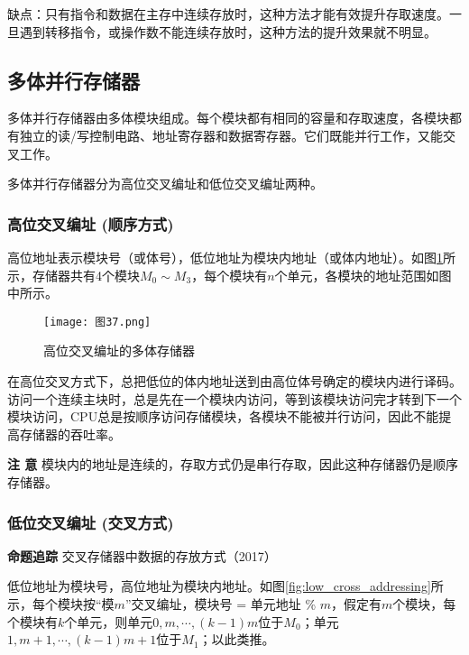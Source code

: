 \documentclass[UTF8]{ctexart}
\begin{document}
	缺点：只有指令和数据在主存中连续存放时，这种方法才能有效提升存取速度。一旦遇到转移指令，或操作数不能连续存放时，这种方法的提升效果就不明显。
	
	\subsection{多体并行存储器}
	多体并行存储器由多体模块组成。每个模块都有相同的容量和存取速度，各模块都有独立的读/写控制电路、地址寄存器和数据寄存器。它们既能并行工作，又能交叉工作。
	
	多体并行存储器分为高位交叉编址和低位交叉编址两种。
	
	\subsubsection{高位交叉编址 (顺序方式)}
	高位地址表示模块号（或体号），低位地址为模块内地址（或体内地址）。如图\ref{fig:high_cross_addressing}所示，存储器共有4个模块$M_0 \sim M_3$，每个模块有$n$个单元，各模块的地址范围如图中所示。
	
	\begin{figure}[h]
		\centering
		\caption{高位交叉编址的多体存储器}
		\label{fig:high_cross_addressing}
		\texttt{[image: 图37.png]} %
	\end{figure}
	
	在高位交叉方式下，总把低位的体内地址送到由高位体号确定的模块内进行译码。访问一个连续主块时，总是先在一个模块内访问，等到该模块访问完才转到下一个模块访问，CPU总是按顺序访问存储模块，各模块不能被并行访问，因此不能提高存储器的吞吐率。
	
	\begin{tcolorbox}[colframe=black, colback=white]
		\kaishu \textbf{注 意} \quad 模块内的地址是连续的，存取方式仍是串行存取，因此这种存储器仍是顺序存储器。
	\end{tcolorbox}
	
	\subsubsection{低位交叉编址 (交叉方式)}
	\begin{tcolorbox}[colframe=black, colback=white]
		\kaishu \textbf{命题追踪} \quad 交叉存储器中数据的存放方式（2017）
	\end{tcolorbox}
	低位地址为模块号，高位地址为模块内地址。如图\ref{fig:low_cross_addressing}所示，每个模块按“模$m$”交叉编址，模块号 = 单元地址 \% $m$，假定有$m$个模块，每个模块有$k$个单元，则单元$0, m, \cdots, (k - 1)m$位于$M_0$；单元$1, m + 1, \cdots, (k - 1)m + 1$位于$M_1$；以此类推。
	
\end{document}
